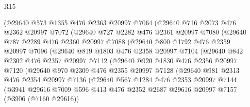\begin{lexlean}{R15}
\begin{coremodule}
          (@29640
            @573
            @1355
            @476
            @2363
            @20997
            @7064
            (@29640
              @716
              @2073
              @476
              @2362
              @20997
              @7072
              (@29640
                @727
                @2282
                @476
                @2361
                @20997
                @7080
                (@29640
                  @787
                  @2289
                  @476
                  @2360
                  @20997
                  @7088
                  (@29640
                    @800
                    @1792
                    @476
                    @2359
                    @20997
                    @7096
                    (@29640
                      @819
                      @1803
                      @476
                      @2358
                      @20997
                      @7104
                      (@29640
                        @842
                        @2302
                        @476
                        @2357
                        @20997
                        @7112
                        (@29640
                          @920
                          @1830
                          @476
                          @2356
                          @20997
                          @7120
                          (@29640
                            @970
                            @2309
                            @476
                            @2355
                            @20997
                            @7128
                            (@29640
                              @981
                              @2313
                              @476
                              @2354
                              @20997
                              @7136
                              (@29640
                                @567
                                @1284
                                @476
                                @2353
                                @20997
                                @7144
                                (@3941
                                  @29616
                                  @7009
                                  @596
                                  @413
                                  @476
                                  @2352
                                  @2687
                                  @29616
                                  @20997
                                  @7157
                                  (@3906 (@7160 @29616))

\end{coremodule}
\end{lexlean}
